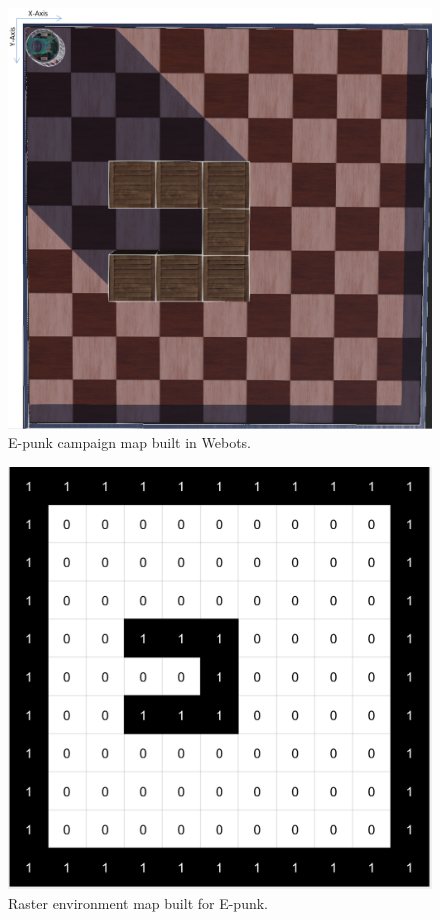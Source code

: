 \documentclass[conference]{IEEEtran}
\begin{document}
\begin{figure}[htbp]
\centerline{\includegraphics[scale=0.22]{RS_Report/Webots_map.png}}
\caption{E-punk campaign map built in Webots.}
\label{fig1}
\end{figure}

\begin{figure}[htbp]
\centerline{\includegraphics[scale=0.7]{map.png}}
\caption{Raster environment map built for E-punk.}
\label{fig2}
\end{figure}
\end{document}
